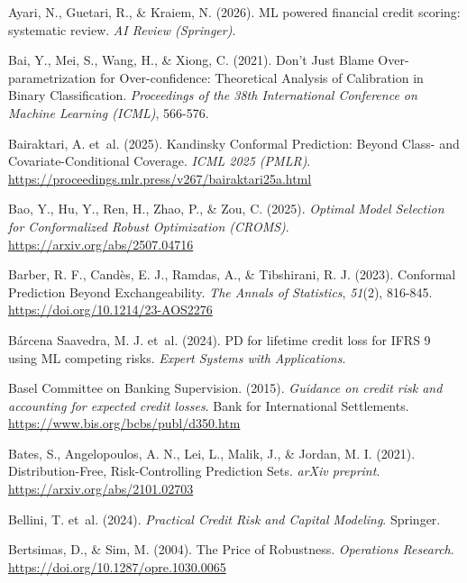 \documentclass[
  spanish,
  11pt,
  letterpaper,
]{scrbook}
\newlength{\cslhangindent}
\newenvironment{CSLReferences}[2] %
 {\begin{list}{}{%
  \setlength{\itemindent}{0pt}
  \setlength{\leftmargin}{0pt}
  \setlength{\parsep}{0pt}
  \ifodd #1
   \setlength{\leftmargin}{\cslhangindent}
   \setlength{\itemindent}{-1\cslhangindent}
  \fi
  \setlength{\itemsep}{#2\baselineskip}}}
 {\end{list}}
\theoremstyle{plain}
\theoremstyle{remark}
\begin{document}
\begin{CSLReferences}{1}{0}
Ayari, N., Guetari, R., \& Kraiem, N. (2026). {ML} powered financial
credit scoring: systematic review. \emph{AI Review (Springer)}.

Bai, Y., Mei, S., Wang, H., \& Xiong, C. (2021). Don't Just Blame
Over-parametrization for Over-confidence: Theoretical Analysis of
Calibration in Binary Classification. \emph{Proceedings of the 38th
International Conference on Machine Learning (ICML)}, 566-576.

{Bairaktari, A. et~al.} (2025). Kandinsky Conformal Prediction: Beyond
Class- and Covariate-Conditional Coverage. \emph{ICML 2025 (PMLR)}.
\url{https://proceedings.mlr.press/v267/bairaktari25a.html}

Bao, Y., Hu, Y., Ren, H., Zhao, P., \& Zou, C. (2025). \emph{Optimal
Model Selection for Conformalized Robust Optimization ({CROMS})}.
\url{https://arxiv.org/abs/2507.04716}

Barber, R. F., Candès, E. J., Ramdas, A., \& Tibshirani, R. J. (2023).
Conformal Prediction Beyond Exchangeability. \emph{The Annals of
Statistics}, \emph{51}(2), 816-845.
\url{https://doi.org/10.1214/23-AOS2276}

{Bárcena Saavedra, M. J. et~al.} (2024). PD for lifetime credit loss for
{IFRS} 9 using {ML} competing risks. \emph{Expert Systems with
Applications}.

Basel Committee on Banking Supervision. (2015). \emph{Guidance on credit
risk and accounting for expected credit losses}. Bank for International
Settlements. \url{https://www.bis.org/bcbs/publ/d350.htm}

Bates, S., Angelopoulos, A. N., Lei, L., Malik, J., \& Jordan, M. I.
(2021). Distribution-Free, Risk-Controlling Prediction Sets. \emph{arXiv
preprint}. \url{https://arxiv.org/abs/2101.02703}

{Bellini, T. et~al.} (2024). \emph{Practical Credit Risk and Capital
Modeling}. Springer.

Bertsimas, D., \& Sim, M. (2004). The Price of Robustness.
\emph{Operations Research}. \url{https://doi.org/10.1287/opre.1030.0065}


\end{CSLReferences}
\end{document}
